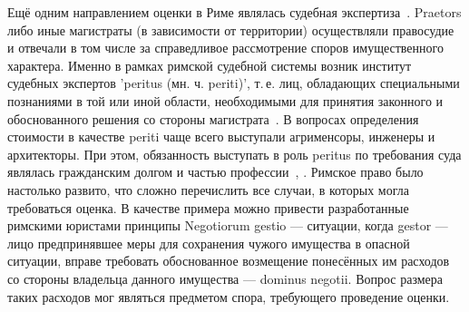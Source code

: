 \documentclass[12pt]{scrartcl}
\begin{document}
Ещё одним направлением оценки в Риме являлась судебная экспертиза~\cite{Smits2002}. Praetors либо иные магистраты (в зависимости от территории) осуществляли правосудие и отвечали в том числе за справедливое рассмотрение споров имущественного характера. Именно в рамках римской судебной системы возник институт судебных экспертов 'peritus (мн. ч. periti)', т.\,е. лиц, обладающих специальными познаниями в той или иной области, необходимыми для принятия законного и обоснованного решения со стороны магистрата~\cite{Mommsen1985}. В вопросах определения стоимости в качестве periti чаще всего выступали агрименсоры, инженеры и архитекторы. При этом, обязанность выступать в роль peritus по требования суда являлась гражданским долгом и частью профессии~\cite{DariMattiacci2020}, \cite{Mousourakis2003}. Римское право было настолько развито, что сложно перечислить все случаи, в которых могла требоваться оценка. В качестве примера можно привести разработанные римскими юристами принципы Negotiorum gestio --- ситуации, когда gestor --- лицо предпринявшее меры для сохранения чужого имущества в опасной ситуации, вправе требовать обоснованное возмещение понесённых им расходов со стороны владельца данного имущества --- dominus negotii. Вопрос размера таких расходов мог являться предметом спора, требующего проведение оценки.
\end{document}
